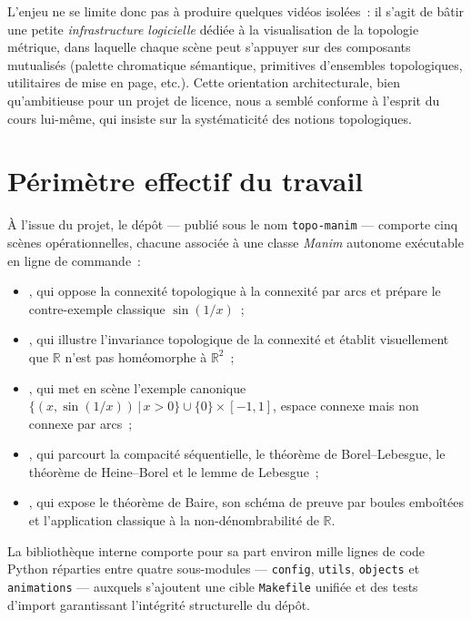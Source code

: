 \documentclass[12pt, a4paper, openany]{report}
\begin{document}
	L’enjeu ne se limite donc pas à produire quelques vidéos isolées~: il s’agit de bâtir une petite \emph{infrastructure logicielle} dédiée à la visualisation de la topologie métrique, dans laquelle chaque scène peut s’appuyer sur des composants mutualisés (palette chromatique sémantique, primitives d’ensembles topologiques, utilitaires de mise en page, etc.). Cette orientation architecturale, bien qu’ambitieuse pour un projet de licence, nous a semblé conforme à l’esprit du cours lui-même, qui insiste sur la systématicité des notions topologiques.

	\section{Périmètre effectif du travail}

	À l’issue du projet, le dépôt — publié sous le nom \texttt{topo-manim} — comporte cinq scènes opérationnelles, chacune associée à une classe \textit{Manim} autonome exécutable en ligne de commande~:

	\begin{itemize}
		\item {}, qui oppose la connexité topologique à la connexité par arcs et prépare le contre-exemple classique $\sin(1/x)$~;
		\item {}, qui illustre l’invariance topologique de la connexité et établit visuellement que $\mathbb{R}$ n’est pas homéomorphe à $\mathbb{R}^2$~;
		\item {}, qui met en scène l’exemple canonique $\{(x,\sin(1/x))\,|\,x>0\}\cup\{0\}\times[-1,1]$, espace connexe mais non connexe par arcs~;
		\item {}, qui parcourt la compacité séquentielle, le théorème de Borel--Lebesgue, le théorème de Heine--Borel et le lemme de Lebesgue~;
		\item {}, qui expose le théorème de Baire, son schéma de preuve par boules emboîtées et l’application classique à la non-dénombrabilité de $\mathbb{R}$.
	\end{itemize}

	La bibliothèque interne comporte pour sa part environ mille lignes de code Python réparties entre quatre sous-modules — \texttt{config}, \texttt{utils}, \texttt{objects} et \texttt{animations} — auxquels s’ajoutent une cible \texttt{Makefile} unifiée et des tests d’import garantissant l’intégrité structurelle du dépôt.
\end{document}
